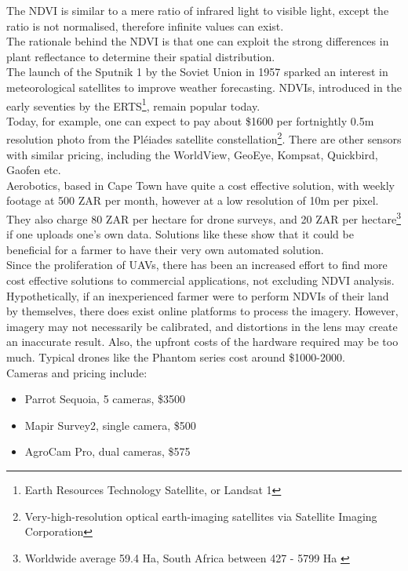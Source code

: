 The NDVI is similar to a mere ratio of infrared light to visible light, except the ratio is not normalised, therefore infinite values can exist.\\

The rationale behind the NDVI is that one can exploit the strong differences in plant reflectance to determine their spatial distribution.\\

The launch of the Sputnik 1 by the Soviet Union in 1957 sparked an interest in meteorological satellites to improve weather forecasting. NDVIs, introduced in the early seventies by the ERTS\footnote{Earth Resources Technology Satellite, or Landsat 1}, remain popular today. \\

Today, for example, one can expect to pay about \$1600 per fortnightly 0.5m resolution photo from the Pléiades satellite constellation\footnote{Very-high-resolution optical earth-imaging satellites via Satellite Imaging Corporation}. There are other sensors with similar pricing, including the WorldView, GeoEye, Kompsat, Quickbird, Gaofen etc.\\Aerobotics, based in Cape Town have quite a cost effective solution, with weekly footage at 500 ZAR per month, however at a low resolution of 10m per pixel. They also charge 80 ZAR per hectare for drone surveys, and 20 ZAR per hectare\footnote{Worldwide average 59.4 Ha\cite{farm_size}, South Africa between 427 - 5799 Ha \cite{farm_size_sa}} if one uploads one's own data. Solutions like these show that it could be beneficial for a farmer to have their very own automated solution.\\

Since the proliferation of UAVs, there has been an increased effort to find more cost effective solutions to commercial applications, not excluding NDVI analysis. Hypothetically, if an inexperienced farmer were to perform NDVIs of their land by themselves, there does exist online platforms to process the imagery. However, imagery may not necessarily be calibrated, and distortions in the lens may create an inaccurate result. Also, the upfront costs of the hardware required may be too much. Typical drones like the Phantom series cost around \$1000-2000. \\Cameras and pricing include:
\begin{itemize}
	\item Parrot Sequoia, 5 cameras, \$3500 \cite{sequoia}
	\item Mapir Survey2, single camera, \$500 \cite{mapir}
	\item AgroCam Pro, dual cameras, \$575 \cite{agrocam}
\end{itemize}

